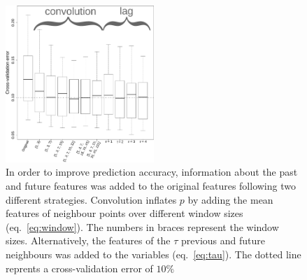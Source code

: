\begin{figure}[h!]
  \centering    
    \includegraphics[width=0.5\textwidth]{figures/temporal_integration.pdf}
  \caption{
  In order to improve prediction accuracy, information about the past and future features was added to the original features following two different strategies.
  Convolution inflates $p$ by adding the mean features of neighbour points over different window sizes (eq.~\ref{eq:window}).
  The numbers in braces represent the window sizes. 
  Alternatively, the features of the $\tau$ previous and future neighbours was added to the variables (eq.~\ref{eq:tau}).
  The dotted line reprents a cross-validation error of $10\%$
  \label{fig:temporal_integration}
  }
\end{figure}
